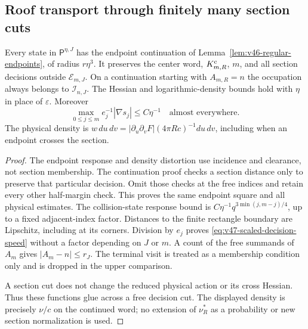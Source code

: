 \subsection{Roof transport through finitely many section cuts}
\begin{lemma}
\label{lem:v47-free-decision-continuation}
Every state in $\mathsf P^{\eta,J}$ has the endpoint continuation
of Lemma~\ref{lem:v46-regular-endpoints}, of radius $r\eta^3$.
It preserves the center word, $K^{\rm c}_{m,R}$, $m$, and all section
decisions outside $\mathcal E_{m,J}$. On a continuation starting with
$A_{m,R}=n$ the occupation always belongs to $\mathcal I_{n,J}$.
The Hessian and logarithmic-density bounds hold with $\eta$ in place
of $\varepsilon$. Moreover
\begin{equation}\label{eq:v47-scaled-decision-speed}
 \max_{0\le j\le m}e_j^{-1}|\nabla s_j|\le C\eta^{-1}
                         \quad\text{almost everywhere}.
\end{equation}
The physical density is $w\,du\,dv=|\partial_u\partial_vF|
(4\pi Rc)^{-1}du\,dv$, including when an endpoint crosses the section.
\end{lemma}
\begin{proof}
The endpoint response and density distortion use incidence and
clearance, not section membership. The continuation proof checks a
section distance only to preserve that particular decision. Omit those
checks at the free indices and retain every other half-margin check.
This proves the same endpoint square and all physical estimates.
The collision-state response bound is
$C\eta^{-1}q^{3\min(j,m-j)/4}$, up to a fixed adjacent-index factor.
Distances to the finite rectangle boundary are Lipschitz, including
at its corners. Division by $e_j$ proves
\eqref{eq:v47-scaled-decision-speed} without a factor depending on
$J$ or $m$. A count of the free summands of $A_m$ gives
$|A_m-n|\le r_J$. The terminal visit is treated as a membership
condition only and is dropped in the upper comparison.

A section cut does not change the reduced physical action or its
cross Hessian. Thus these functions glue across a free decision cut.
The displayed density is precisely $\nu/c$ on the continued word;
no extension of $\nu_R^*$ as a probability or new section
normalization is used.
\end{proof}

